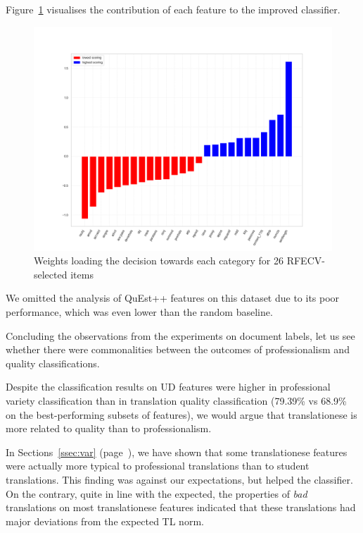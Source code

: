 Figure~\ref{fig:qua-weights} visualises the contribution of each feature to the improved classifier. 
 
\vspace{-2em}
\begin{figure}[H]
	\centering
	\includegraphics[width=.85\linewidth]{figures/bad-good-bars-ud26}
	\caption{\label{fig:qua-weights}Weights loading the decision towards each category for 26 RFECV-selected items}	
\end{figure}

We omitted the analysis of QuEst++ features on this dataset due to its poor performance, which was even lower than the random baseline.

Concluding the observations from the experiments on document labels, let us see whether there were commonalities between the outcomes of professionalism and quality classifications. 

Despite the classification results on UD features were higher in professional variety classification than in translation quality classification (79.39\% vs 68.9\% on the best-performing subsets of features), we would argue that translationese is more related to quality than to professionalism.
 
In Sections~\ref{ssec:var} (page~\pageref{pg:more_professional_more_translated}), we have shown that some translationese features were actually more typical to professional translations than to student translations. This finding was against our expectations, but helped the classifier. 
On the contrary, quite in line with the expected, the properties of \textit{bad} translations on most translationese features indicated that these translations had major deviations from the expected TL norm. %
 
